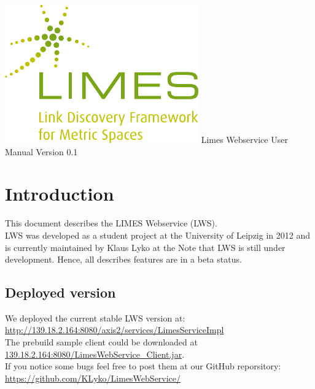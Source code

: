 \documentclass{article}
\begin{document}
\begin{titlepage}
	\begin{center}
		\includegraphics[width=\textwidth]{images/limes_logo.pdf}
		\centering
		\huge Limes Webservice User Manual
		\huge Version 0.1	
		\vfill
	\end{center}
\end{titlepage}
\tableofcontents
\newpage
\section{Introduction}
This document describes the LIMES Webservice (LWS).\\
LWS was developed as a student project at the University of Leipzig in 2012 and is currently maintained by Klaus Lyko at the 
Note that LWS is still under development. Hence, all describes features are in a beta status.

\subsection{Deployed version}
We deployed the current stable LWS version at: \url{http://139.18.2.164:8080/axis2/services/LimesServiceImpl} \\
The prebuild sample client could be downloaded at \url{139.18.2.164:8080/LimesWebService_Client.jar}.\\
If you notice some bugs feel free to post them at our GitHub reporsitory: \url{https://github.com/KLyko/LimesWebService/}
\end{document}
